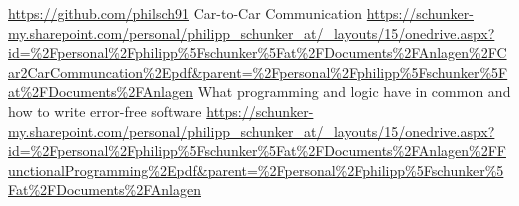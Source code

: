 \begin{longtabu}
	\small{\url{https://github.com/philsch91}} \newline
	Car-to-Car Communication \newline
	\small{\url{https://schunker-my.sharepoint.com/personal/philipp_schunker_at/_layouts/15/onedrive.aspx?id=\%2Fpersonal\%2Fphilipp\%5Fschunker\%5Fat\%2FDocuments\%2FAnlagen\%2FCar2CarCommuncation\%2Epdf&parent=\%2Fpersonal\%2Fphilipp\%5Fschunker\%5Fat\%2FDocuments\%2FAnlagen}} \newline
	What programming and logic have in common and how to write error-free software \newline
	\small{\url{https://schunker-my.sharepoint.com/personal/philipp_schunker_at/_layouts/15/onedrive.aspx?id=\%2Fpersonal\%2Fphilipp\%5Fschunker\%5Fat\%2FDocuments\%2FAnlagen\%2FFunctionalProgramming\%2Epdf&parent=\%2Fpersonal\%2Fphilipp\%5Fschunker\%5Fat\%2FDocuments\%2FAnlagen}} \newline
\end{longtabu}

